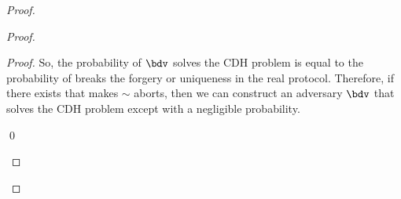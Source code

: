 \begin{proof}
\begin{proof}
\begin{proof}
			So, the probability of $ \bdv $ solves the CDH problem is equal to the probability of \adv breaks the forgery or uniqueness in the real protocol. Therefore,  if there exists \adv that makes $ \sim$ aborts, then we can construct an adversary $ \bdv $ that solves the CDH problem except with a negligible probability.
			
			
			\qed	  
		\end{proof}
		
	\end{proof}
\end{proof}

